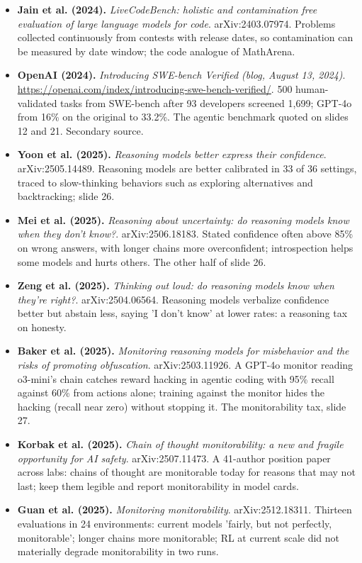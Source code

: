\begin{itemize}[leftmargin=1.2em,itemsep=3pt]
\item \textbf{Jain et al. (2024).} \textit{LiveCodeBench: holistic and contamination free evaluation of large language models for code}. arXiv:2403.07974. Problems collected continuously from contests with release dates, so contamination can be measured by date window; the code analogue of MathArena.
\item \textbf{OpenAI (2024).} \textit{Introducing SWE-bench Verified (blog, August 13, 2024)}. \url{https://openai.com/index/introducing-swe-bench-verified/}. 500 human-validated tasks from SWE-bench after 93 developers screened 1,699; GPT-4o from 16\% on the original to 33.2\%. The agentic benchmark quoted on slides 12 and 21. Secondary source.
\item \textbf{Yoon et al. (2025).} \textit{Reasoning models better express their confidence}. arXiv:2505.14489. Reasoning models are better calibrated in 33 of 36 settings, traced to slow-thinking behaviors such as exploring alternatives and backtracking; slide 26.
\item \textbf{Mei et al. (2025).} \textit{Reasoning about uncertainty: do reasoning models know when they don't know?}. arXiv:2506.18183. Stated confidence often above 85\% on wrong answers, with longer chains more overconfident; introspection helps some models and hurts others. The other half of slide 26.
\item \textbf{Zeng et al. (2025).} \textit{Thinking out loud: do reasoning models know when they're right?}. arXiv:2504.06564. Reasoning models verbalize confidence better but abstain less, saying 'I don't know' at lower rates: a reasoning tax on honesty.
\item \textbf{Baker et al. (2025).} \textit{Monitoring reasoning models for misbehavior and the risks of promoting obfuscation}. arXiv:2503.11926. A GPT-4o monitor reading o3-mini's chain catches reward hacking in agentic coding with 95\% recall against 60\% from actions alone; training against the monitor hides the hacking (recall near zero) without stopping it. The monitorability tax, slide 27.
\item \textbf{Korbak et al. (2025).} \textit{Chain of thought monitorability: a new and fragile opportunity for AI safety}. arXiv:2507.11473. A 41-author position paper across labs: chains of thought are monitorable today for reasons that may not last; keep them legible and report monitorability in model cards.
\item \textbf{Guan et al. (2025).} \textit{Monitoring monitorability}. arXiv:2512.18311. Thirteen evaluations in 24 environments: current models 'fairly, but not perfectly, monitorable'; longer chains more monitorable; RL at current scale did not materially degrade monitorability in two runs.

\end{itemize}

